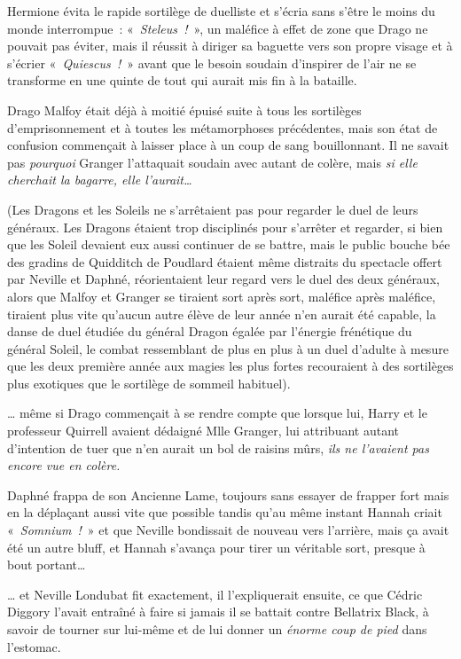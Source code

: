 Hermione évita le rapide sortilège de duelliste et s'écria sans s'être le moins du monde interrompue~: «~\emph{Steleus~!}~», un maléfice à effet de zone que Drago ne pouvait pas éviter, mais il réussit à diriger sa baguette vers son propre visage et à s'écrier «~\emph{Quiescus~!}~» avant que le besoin soudain d'inspirer de l'air ne se transforme en une quinte de tout qui aurait mis fin à la bataille.

Drago Malfoy était déjà à moitié épuisé suite à tous les sortilèges d'emprisonnement et à toutes les métamorphoses précédentes, mais son état de confusion commençait à laisser place à un coup de sang bouillonnant. Il ne savait pas \emph{pourquoi} Granger l'attaquait soudain avec autant de colère, mais \emph{si elle cherchait la bagarre, elle l'aurait…}

(Les Dragons et les Soleils ne s'arrêtaient pas pour regarder le duel de leurs généraux. Les Dragons étaient trop disciplinés pour s'arrêter et regarder, si bien que les Soleil devaient eux aussi continuer de se battre, mais le public bouche bée des gradins de Quidditch de Poudlard étaient même distraits du spectacle offert par Neville et Daphné, réorientaient leur regard vers le duel des deux généraux, alors que Malfoy et Granger se tiraient sort après sort, maléfice après maléfice, tiraient plus vite qu'aucun autre élève de leur année n'en aurait été capable, la danse de duel étudiée du général Dragon égalée par l'énergie frénétique du général Soleil, le combat ressemblant de plus en plus à un duel d'adulte à mesure que les deux première année aux magies les plus fortes recouraient à des sortilèges plus exotiques que le sortilège de sommeil habituel).

… même si Drago commençait à se rendre compte que lorsque lui, Harry et le professeur Quirrell avaient dédaigné Mlle Granger, lui attribuant autant d'intention de tuer que n'en aurait un bol de raisins mûrs, \emph{ils ne l'avaient pas encore vue en colère.}

\later

Daphné frappa de son Ancienne Lame, toujours sans essayer de frapper fort mais en la déplaçant aussi vite que possible tandis qu'au même instant Hannah criait «~\emph{Somnium~!}~» et que Neville bondissait de nouveau vers l'arrière, mais ça avait été un autre bluff, et Hannah s'avança pour tirer un véritable sort, presque à bout portant…

… et Neville Londubat fit exactement, il l'expliquerait ensuite, ce que Cédric Diggory l'avait entraîné à faire si jamais il se battait contre Bellatrix Black, à savoir de tourner sur lui-même et de lui donner un \emph{énorme coup de pied} dans l'estomac.


